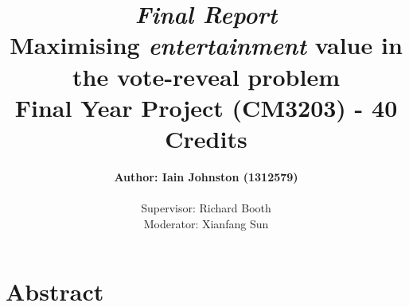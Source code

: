 \documentclass[12pt]{report}
\title{\textit{Final Report}\\\textbf{Maximising \textit{entertainment} value in the vote-reveal problem}\\ Final Year Project (CM3203) - 40 Credits}
\author{\textbf{Author: Iain Johnston (1312579)} \\ \\ Supervisor: Richard Booth\\ Moderator: Xianfang Sun}
\date{} %
\begin{document}
\maketitle
\clearpage

\section*{Abstract}
\end{document}
